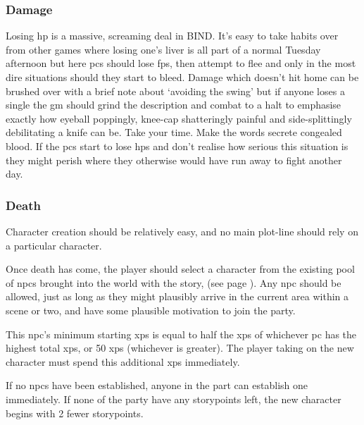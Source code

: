 \begin{multicols}{2}
\subsubsection{Damage}

Losing \gls{hp} is a massive, screaming deal in BIND.
It's easy to take habits over from other games where losing one's liver is all part of a normal Tuesday afternoon but here \glspl{pc} should lose \glspl{fp}, then attempt to flee and only in the most dire situations should they start to bleed.
Damage which doesn't hit home can be brushed over with a brief note about `avoiding the swing' but if anyone loses a single  the \gls{gm} should grind the description and combat to a halt to emphasise exactly how eyeball poppingly, knee-cap shatteringly painful and side-splittingly debilitating a knife can be.
Take your time.
Make the words secrete congealed blood.
If the \glspl{pc} start to lose \glspl{hp} and don't realise how serious this situation is they might perish where they otherwise would have run away to fight another day.

\subsubsection{Death}
\label{pcdeath}

\iftoggle{aif}{
  Players who want their characters to survive should retire them.
  After all, few of the active Night Guard survive for long.
}{
  Players should see their character's death as normal, and even likely.
}
Character creation should be relatively easy, and no main plot-line should rely on a particular character.

Once death has come, the player should select a character from the existing pool of \glspl{npc} brought into the world with the story,  (see page \pageref{oldnpc}).
Any \gls{npc} should be allowed, just as long as they might plausibly arrive in the current area within a scene or two, and have some plausible motivation to join the party.

This \gls{npc}'s minimum starting \glspl{xp} is equal to half the \glspl{xp} of whichever \gls{pc} has the highest total \glspl{xp}, or 50 \glspl{xp} (whichever is greater).
The player taking on the new character must spend this additional \glspl{xp} immediately.

If no \glspl{npc} have been established, anyone in the part can establish one immediately.
If none of the party have any \glspl{storypoint} left, the new character begins with 2 fewer \glspl{storypoint}.


\end{multicols}
